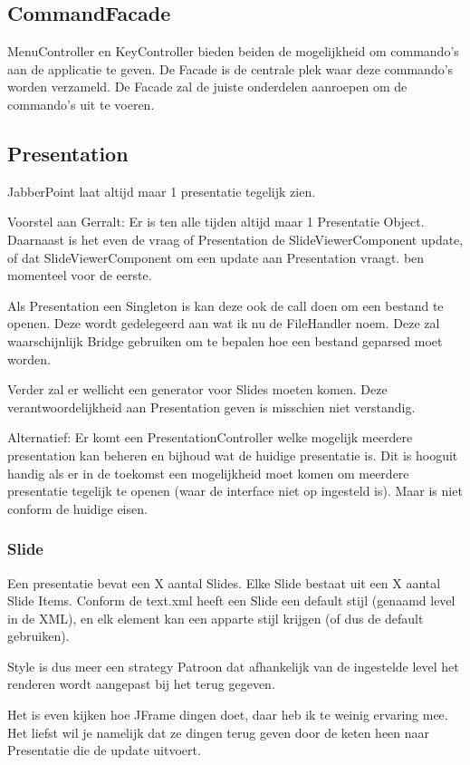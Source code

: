 \documentclass[a4paper]{article}
\begin{document}
\subsection{CommandFacade}
MenuController en KeyController bieden beiden de mogelijkheid om commando's aan
de applicatie te geven. De Facade is de centrale plek waar deze commando's
worden verzameld. De Facade zal de juiste onderdelen aanroepen om de commando's
uit te voeren.

\subsection{Presentation}
JabberPoint laat altijd maar 1 presentatie tegelijk zien.

Voorstel aan Gerralt: Er is ten alle tijden altijd maar 1 Presentatie Object.
Daarnaast is het even de vraag of Presentation de SlideViewerComponent update,
of dat SlideViewerComponent om een update aan Presentation vraagt. ben momenteel
voor de eerste.

Als Presentation een Singleton is kan deze ook de call doen om een bestand te
openen. Deze wordt gedelegeerd aan wat ik nu de FileHandler noem. Deze zal
waarschijnlijk Bridge gebruiken om te bepalen hoe een bestand geparsed moet
worden.

Verder zal er wellicht een generator voor Slides moeten komen. Deze
verantwoordelijkheid aan Presentation geven is misschien niet verstandig.

Alternatief: Er komt een PresentationController welke mogelijk meerdere
presentation kan beheren en bijhoud wat de huidige presentatie is. Dit is
hooguit handig als er in de toekomst een mogelijkheid moet komen om meerdere
presentatie tegelijk te openen (waar de interface niet op ingesteld is). Maar is
niet conform de huidige eisen.

\subsubsection{Slide}
Een presentatie bevat een X aantal Slides. Elke Slide bestaat uit een X aantal
Slide Items. Conform de text.xml heeft een Slide een default stijl (genaamd
level in de XML), en elk element kan een apparte stijl krijgen (of dus de
default gebruiken).

Style is dus meer een strategy Patroon dat afhankelijk van de ingestelde level
het renderen wordt aangepast bij het terug gegeven.

Het is even kijken hoe JFrame dingen doet, daar heb ik te weinig ervaring mee.
Het liefst wil je namelijk dat ze dingen terug geven door de keten heen naar
Presentatie die de update uitvoert.
\end{document}
